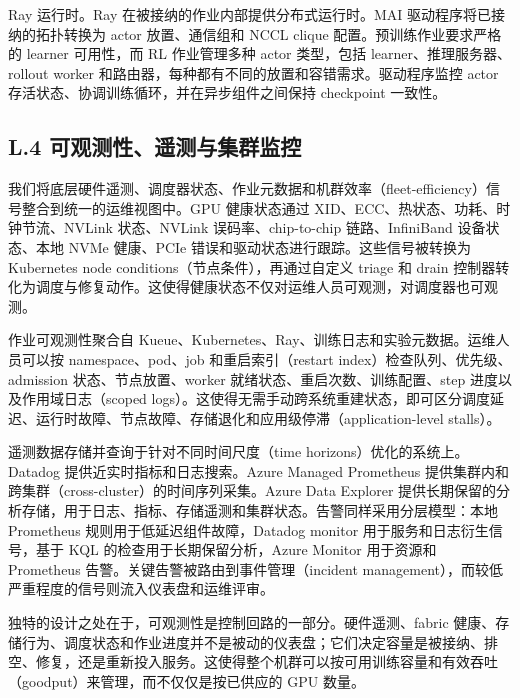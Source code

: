Ray 运行时。Ray 在被接纳的作业内部提供分布式运行时。MAI 驱动程序将已接纳的拓扑转换为 actor 放置、通信组和 NCCL clique 配置。预训练作业要求严格的 learner 可用性，而 RL 作业管理多种 actor 类型，包括 learner、推理服务器、rollout worker 和路由器，每种都有不同的放置和容错需求。驱动程序监控 actor 存活状态、协调训练循环，并在异步组件之间保持 checkpoint 一致性。

\subsection{L.4 可观测性、遥测与集群监控}\label{l.4-observability-telemetry-and-fleet-monitoring}

我们将底层硬件遥测、调度器状态、作业元数据和机群效率（fleet-efficiency）信号整合到统一的运维视图中。GPU 健康状态通过 XID、ECC、热状态、功耗、时钟节流、NVLink 状态、NVLink 误码率、chip-to-chip 链路、InfiniBand 设备状态、本地 NVMe 健康、PCIe 错误和驱动状态进行跟踪。这些信号被转换为 Kubernetes node conditions（节点条件），再通过自定义 triage 和 drain 控制器转化为调度与修复动作。这使得健康状态不仅对运维人员可观测，对调度器也可观测。

作业可观测性聚合自 Kueue、Kubernetes、Ray、训练日志和实验元数据。运维人员可以按 namespace、pod、job 和重启索引（restart index）检查队列、优先级、admission 状态、节点放置、worker 就绪状态、重启次数、训练配置、step 进度以及作用域日志（scoped logs）。这使得无需手动跨系统重建状态，即可区分调度延迟、运行时故障、节点故障、存储退化和应用级停滞（application-level stalls）。

遥测数据存储并查询于针对不同时间尺度（time horizons）优化的系统上。Datadog 提供近实时指标和日志搜索。Azure Managed Prometheus 提供集群内和跨集群（cross-cluster）的时间序列采集。Azure Data Explorer 提供长期保留的分析存储，用于日志、指标、存储遥测和集群状态。告警同样采用分层模型：本地 Prometheus 规则用于低延迟组件故障，Datadog monitor 用于服务和日志衍生信号，基于 KQL 的检查用于长期保留分析，Azure Monitor 用于资源和 Prometheus 告警。关键告警被路由到事件管理（incident management），而较低严重程度的信号则流入仪表盘和运维评审。

独特的设计之处在于，可观测性是控制回路的一部分。硬件遥测、fabric 健康、存储行为、调度状态和作业进度并不是被动的仪表盘；它们决定容量是被接纳、排空、修复，还是重新投入服务。这使得整个机群可以按可用训练容量和有效吞吐（goodput）来管理，而不仅仅是按已供应的 GPU 数量。
